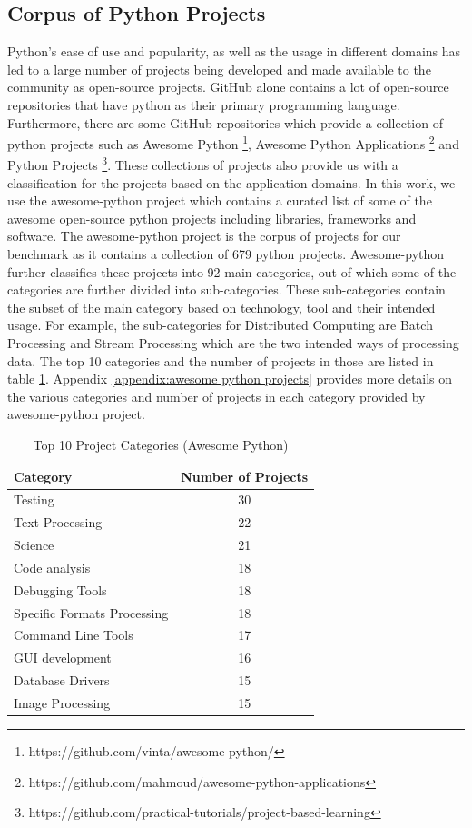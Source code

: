 \subsection{Corpus of Python Projects}
\label{approach:corpus of python projects}
Python's ease of use and popularity, as well as the usage in different domains has led to a large number of projects being developed and made available to the community as open-source projects.
GitHub alone contains a lot of open-source repositories that have python as their primary programming language.
Furthermore, there are some GitHub repositories which provide a collection of python projects such as Awesome Python \footnote{https://github.com/vinta/awesome-python/}, Awesome Python Applications \footnote{https://github.com/mahmoud/awesome-python-applications} and Python Projects \footnote{https://github.com/practical-tutorials/project-based-learning}.
These collections of projects also provide us with a classification for the projects based on the application domains.
In this work, we use the awesome-python project which contains a curated list of some of the awesome open-source python projects including libraries, frameworks and software. 
The awesome-python project is the corpus of projects for our benchmark as it contains a collection of 679 python projects.
Awesome-python further classifies these projects into 92 main categories, out of which some of the categories are further divided into sub-categories.
These sub-categories contain the subset of the main category based on technology, tool and their intended usage.
For example, the sub-categories for Distributed Computing are Batch Processing and Stream Processing which are the two intended ways of processing data.
The top 10 categories and the number of projects in those are listed in table \ref{table:awesome-python}.
Appendix \ref{appendix:awesome python projects} provides more details on the various categories and number of projects in each category provided by awesome-python project.

\begin{table}[ht]
    \centering
    \begin{tabular}{lc}
    \hline
    \textbf{Category} & \textbf{Number of Projects}\\
    \hline
    Testing & 30\\
    Text Processing & 22\\
    Science & 21\\
    Code analysis & 18\\
    Debugging Tools & 18\\
    Specific Formats Processing & 18\\
    Command Line Tools & 17\\
    GUI development & 16\\
    Database Drivers & 15\\
    Image Processing & 15\\
    \hline
    \end{tabular}
    \caption{Top 10 Project Categories (Awesome Python)}
    \label{table:awesome-python}
\end{table}

